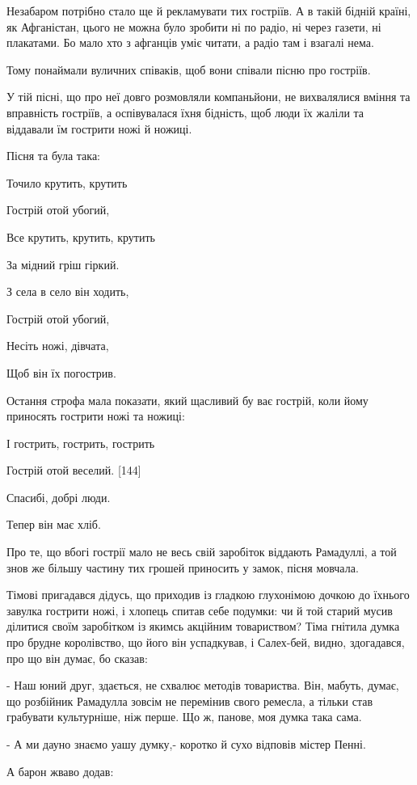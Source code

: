 Незабаром потрібно стало ще й рекламувати тих гостріїв. А в такій бідній країні, як Афганістан, цього не можна було зробити ні по радіо, ні через газети, ні плакатами. Бо мало хто з афганців уміє читати, а радіо там і взагалі нема.

Тому понаймали вуличних співаків, щоб вони співали пісню про гостріїв.

У тій пісні, що про неї довго розмовляли компаньйони, не вихвалялися вміння та вправність гостріїв, а оспівувалася їхня бідність, щоб люди їх жаліли та віддавали їм гострити ножі й ножиці.

Пісня та була така:

Точило крутить, крутить

Гострій отой убогий,

Все крутить, крутить, крутить

За мідний гріш гіркий.

З села в село він ходить,

Гострій отой убогий,

Несіть ножі, дівчата,

Щоб він їх погострив.

Остання строфа мала показати, який щасливий бу ває гострій, коли йому приносять гострити ножі та ножиці:

І гострить, гострить, гострить

Гострій отой веселий. [144]

Спасибі, добрі люди.

Тепер він має хліб.

Про те, що вбогі гострії мало не весь свій заробіток віддають Рамадуллі, а той знов же більшу частину тих грошей приносить у замок, пісня мовчала.

Тімові пригадався дідусь, що приходив із гладкою глухонімою дочкою до їхнього завулка гострити ножі, і хлопець спитав себе подумки: чи й той старий мусив ділитися своїм заробітком із якимсь акційним товариством? Тіма гнітила думка про брудне королівство, що його він успадкував, і Салех-бей, видно, здогадався, про що він думає, бо сказав:

- Наш юний друг, здається, не схвалює методів товариства. Він, мабуть, думає, що розбійник Рамадулла зовсім не перемінив свого ремесла, а тільки став грабувати культурніше, ніж перше. Що ж, панове, моя думка така сама.

- А ми дауно знаємо уашу думку,- коротко й сухо відповів містер Пенні.

А барон жваво додав:

